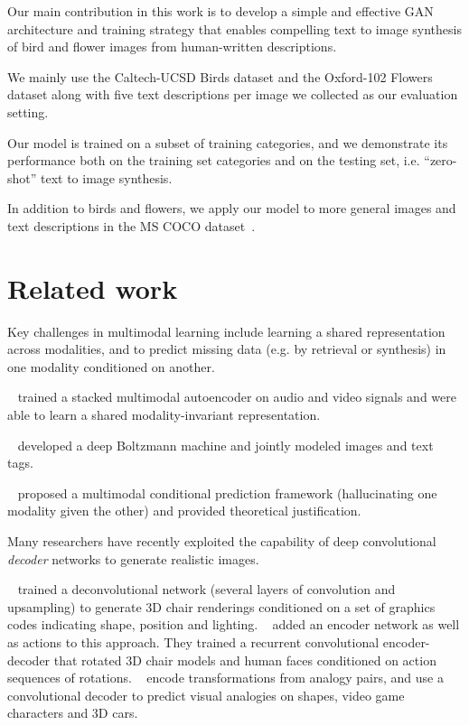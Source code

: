 Our main contribution in this work is to develop a simple and effective GAN architecture and training strategy that enables compelling text to image synthesis of bird and flower images from human-written descriptions.

We mainly use the Caltech-UCSD Birds dataset and the Oxford-102 Flowers dataset along with five text descriptions per image we collected as our evaluation setting.

Our model is trained on a subset of training categories, and we demonstrate its performance both on the training set categories and on the testing set, i.e. ``zero-shot'' text to image synthesis.

In addition to birds and flowers, we apply our model to more general images and text descriptions in the MS COCO dataset~\cite{lin2014microsoft}.

\section{Related work}
\label{related}

Key challenges in multimodal learning include learning a shared representation across modalities, and to predict missing data (e.g. by retrieval or synthesis) in one modality conditioned on another.

~\citet{ngiam2011multimodal} trained a stacked multimodal autoencoder on audio and video signals and were able to learn a shared modality-invariant representation. 

~\citet{srivastava2012multimodal} developed a deep Boltzmann machine and jointly modeled images and text tags. 

~\citet{sohn2014improved} proposed a multimodal conditional prediction framework (hallucinating one modality given the other) and provided theoretical justification.

Many researchers have recently exploited the capability of deep convolutional \emph{decoder} networks to generate realistic images.

~\citet{dosovitskiy2015learning} trained a deconvolutional network (several layers of convolution and upsampling) to generate 3D chair renderings conditioned on a set of graphics codes indicating shape, position and lighting.
~\citet{yang2015weakly} added an encoder network as well as actions to this approach. They trained a recurrent convolutional encoder-decoder that rotated 3D chair models and human faces conditioned on action sequences of rotations.
~\citet{reed2015deep} encode transformations from analogy pairs, and use a convolutional decoder to predict visual analogies on shapes, video game characters and 3D cars.

